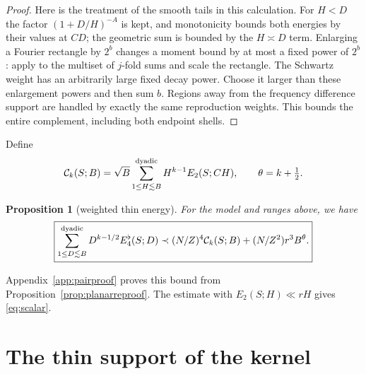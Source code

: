 \documentclass[11pt]{amsart}
\numberwithin{equation}{section}
\newtheorem{proposition}[theorem]{Proposition}
\begin{document}
\begin{proof}
Here is the treatment of the smooth tails in this calculation.
For $H<D$ the factor $(1+D/H)^{-A}$ is kept, and monotonicity
bounds both energies by their values at $CD$; the geometric sum is
bounded by the $H\asymp D$ term. Enlarging a Fourier rectangle by
$2^b$ changes a moment bound by at most a fixed power of $2^b$:
apply \cite[Lemma~\ref*{six-lem:enlarge}]{Weighted} to the multiset of $j$-fold sums and
scale the rectangle. The Schwartz weight has an arbitrarily large
fixed decay power. Choose it larger than these enlargement powers
and then sum $b$. Regions away from the frequency difference support
are handled by exactly the same reproduction weights. This bounds the entire complement, including both endpoint shells.
\end{proof}


Define
\[
 \mathcal C_k(S;B)=
 \sqrt B\sum_{1\le H\lesssim B}^{\rm dyadic}
                  H^{k-1}E_2(S;CH),\qquad \theta=k+\tfrac12.
\]
\begin{proposition}[weighted thin energy]\label{prop:pairprofile}
For the model and ranges above, we have
\begin{equation}\label{eq:pairprofile}
\boxed{
 \sum_{1\le D\lesssim B}^{\rm dyadic}
       D^{k-1/2}E_4^\flat(S;D)
 \prec (N/Z)^4\mathcal C_k(S;B)
            +(N/Z^2)r^3 B^\theta.}
\end{equation}
\end{proposition}
Appendix~\ref{app:pairproof} proves this bound from
Proposition~\ref{prop:planarreproof}. The estimate with
$E_2(S;H)\ll rH$ gives \eqref{eq:scalar}.

\section{The thin support of the kernel}
\label{app:support}\label{sec:thinsupport}
\end{document}
